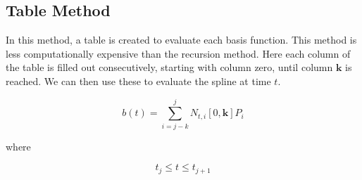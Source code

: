 \documentclass{article}
\begin{document}
\subsection{Table Method}

 In this method, a table is created to evaluate each basis function. This method is less computationally expensive than the recursion method. Here each column of the table is filled out consecutively, starting with column zero, until column \(\textbf{k}\) is reached. We can then use these to evaluate the spline at time \(t\).
 
  \begin{equation}
    b(t) = \sum^{j}_{i=j-k} N_{t,i}[0,\textbf{k}] P_i
\end{equation}

where

\begin{equation}
  t_{j} \leq t \le t_{j+1}
\end{equation}
 
 \hspace{1cm}
\end{document}
